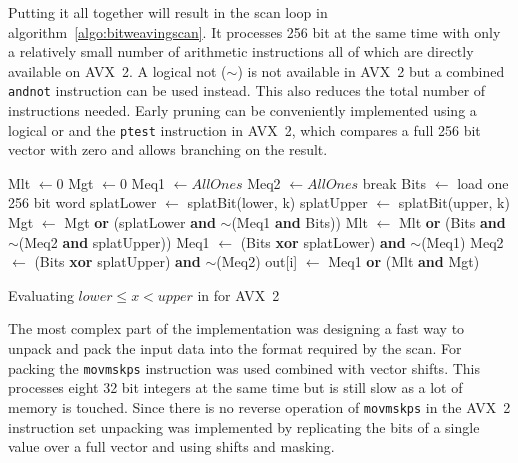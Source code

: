 Putting it all together will result in the scan loop in
algorithm~\ref{algo:bitweavingscan}. It processes 256 bit at the same time with
only a relatively small number of arithmetic instructions all of which are
directly available on AVX~2. A logical not ($\sim$) is not available in AVX~2
but a combined \texttt{andnot} instruction can be used instead. This also
reduces the total number of instructions needed. Early pruning can be
conveniently implemented using a logical or and the \texttt{ptest} instruction
in AVX~2, which compares a full 256 bit vector with zero and allows branching on
the result.

\begin{algorithm}[h]
\begin{algorithmic}[1]
    \State Mlt $\gets 0$
    \State Mgt $\gets 0$
    \State Meq1 $\gets AllOnes$
    \State Meq2 $\gets AllOnes$
          \State break 
        \EndIf
        \State Bits $\gets$ load one 256 bit word
        \State splatLower $\gets$ splatBit(lower, k)
        \State splatUpper $\gets$ splatBit(upper, k)
        \State Mgt $\gets$ Mgt \textbf{or} (splatLower \textbf{and} $\sim$(Meq1 \textbf{and} Bits))
        \State Mlt $\gets$ Mlt \textbf{or} (Bits \textbf{and} $\sim$(Meq2 \textbf{and} splatUpper))
        \State Meq1 $\gets$ (Bits \textbf{xor} splatLower) \textbf{and} $\sim$(Meq1)
        \State Meq2 $\gets$ (Bits \textbf{xor} splatUpper) \textbf{and} $\sim$(Meq2)
      \EndFor
    \EndFor
    \State out[i] $\gets$ Meq1 \textbf{or} (Mlt \textbf{and} Mgt)
  \EndFor
  \EndProcedure
\end{algorithmic}
\caption{Evaluating $lower \le x < upper$ in \bwv{} for AVX~2}
\label{algo:bitweavingscan}
\end{algorithm}

The most complex part of the implementation was designing a fast way to unpack
and pack the input data into the format required by the \bwv{} scan. For packing
the \texttt{movmskps} instruction was used combined with vector shifts. This
processes eight 32 bit integers at the same time but is still slow as a lot of
memory is touched. Since there is no reverse operation of \texttt{movmskps} in
the AVX~2 instruction set unpacking was implemented by replicating the bits of a
single value over a full vector and using shifts and masking.

